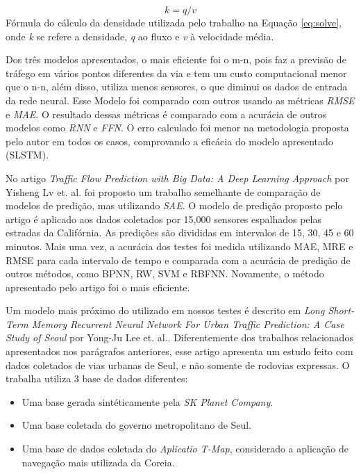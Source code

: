 \begin{equation}\label{eq:solve}
k = q / v
\end{equation}
Fórmula do cálculo da densidade utilizada pelo trabalho na Equação \ref{eq:solve}, onde \textit{k} se refere a densidade, \textit{q} ao fluxo e \textit{v} à velocidade média.

Dos três modelos apresentados, o mais eficiente foi o m-n, pois faz a previsão de tráfego em vários pontos diferentes da via e tem um custo computacional menor que o n-n, além disso, utiliza menos sensores, o que diminui os dados de entrada da rede neural. Esse Modelo foi comparado com outros usando as métricas \textit{\acrshort{RMSE}} e \textit{\acrshort{MAE}}. O resultado dessas métricas é comparado com a acurácia de outros modelos como \textit{\acrfull{RNN}} e \textit{\acrfull{FFN}}. O erro calculado foi menor na metodologia proposta pelo autor em todos os casos, comprovando a eficácia do modelo apresentado (SLSTM).

No artigo \textit{Traffic Flow Prediction with Big Data: A Deep Learning Approach} \cite{lv_6894591} por Yisheng Lv et. al. foi proposto um trabalho semelhante de comparação de modelos de predição, mas utilizando \textit{\acrfull{SAE}}. O modelo de predição proposto pelo artigo é aplicado aos dados coletados por 15,000 sensores espalhados pelas estradas da Califórnia. As predições são divididas em intervalos de 15, 30, 45 e 60 minutos. Mais uma vez, a acurácia dos testes foi medida utilizando  \acrshort{MAE}, \acrshort{MRE} e \acrshort{RMSE} para cada intervalo de tempo e comparada com a acurácia de predição de outros métodos, como \acrfull{BPNN}, \acrfull{RW}, \acrfull{SVM} e \acrfull{RBFNN}. Novamente, o método apresentado pelo artigo foi o mais eficiente.

Um modelo mais próximo do utilizado em nossos testes é descrito em \textit{Long Short-Term Memory Recurrent Neural Network For Urban Traffic Prediction: A Case Study of Seoul} \cite{Seoul} por Yong-Ju Lee et. al.. Diferentemente dos trabalhos relacionados apresentados nos parágrafos anteriores, esse artigo apresenta um estudo feito com dados coletados de vias urbanas de Seul, e não somente de rodovias expressas. O trabalha utiliza 3 base de dados diferentes:

\begin{itemize}
    \item Uma base gerada sintéticamente pela \textit{SK Planet Company}.
    \item Uma base coletada do governo metropolitano de Seul.
    \item Uma base de dados coletada do \textit{Aplicatio T-Map}, considerado a aplicação de navegação mais utilizada da Coreia.
\end{itemize} 

